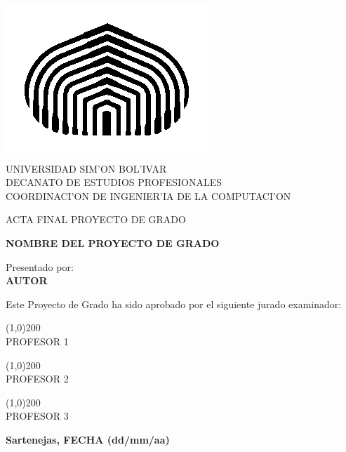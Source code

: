 \begin{titlepage}
\begin{center}

\includegraphics[scale=0.5,type=png,ext=.png,read=.png]{figures/cebolla} \\

\textsc {\large UNIVERSIDAD SIM'ON BOL'IVAR} \\
\textsc{DECANATO DE ESTUDIOS PROFESIONALES\\
COORDINACI'ON DE INGENIER'IA DE LA COMPUTACI'ON}

\bigskip
\bigskip
\bigskip
\bigskip
\bigskip
\bigskip

\textsc{ACTA FINAL PROYECTO DE GRADO}

\bigskip
\bigskip

\textsc{\bfseries NOMBRE DEL PROYECTO DE GRADO}

\bigskip
\bigskip
\bigskip
\bigskip

\begin{minipage}{\textwidth}
\centering
Presentado por: \\
\textsc{\bfseries AUTOR} \\

\bigskip
\bigskip
\bigskip
\bigskip

Este Proyecto de Grado ha sido aprobado por el siguiente jurado examinador: \\

\bigskip
\bigskip

\line(1,0){200} \\
PROFESOR 1\\

\bigskip
\bigskip

\line(1,0){200} \\
PROFESOR 2 \\

\bigskip
\bigskip

\line(1,0){200} \\
PROFESOR 3 \\
\end{minipage}

\bigskip
\bigskip
\vfill

{\large \bfseries Sartenejas, FECHA (dd/mm/aa)}

\end{center}
\end{titlepage}
